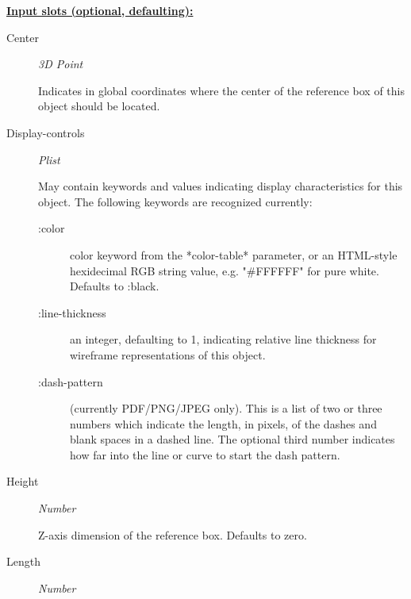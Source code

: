 \documentclass [11pt]{book}
\begin{document}
\begin{itemize}
\begin{description}
\end{description}






\textbf{
\underline{Input slots (optional, defaulting):}}

\begin{description}

\item [Center]
\emph{3D Point}

 Indicates in global coordinates where the center of the reference
box of this object should be located.




\item [Display-controls]
\emph{Plist}

 May contain keywords and values indicating display characteristics for
this object. The following keywords are recognized currently:



\begin{description}


\item[:color]
 color keyword from the *color-table* parameter, or an HTML-style hexidecimal
RGB string value, e.g. "\#FFFFFF" for pure white. Defaults to :black.


\item[:line-thickness]
 an integer, defaulting to 1, indicating relative line thickness for wireframe
representations of this object.


\item[:dash-pattern]
(currently PDF/PNG/JPEG only). This is a list of two or three numbers which indicate the length,
in pixels, of the dashes and blank spaces in a dashed line. The optional third number
indicates how far into the line or curve to start the dash pattern.

\end{description}





\item [Height]
\emph{Number}

 Z-axis dimension of the reference box. Defaults to zero.




\item [Length]
\emph{Number}


\end{description}
\end{itemize}
\end{document}
